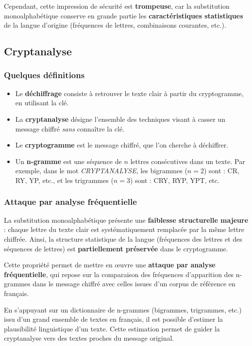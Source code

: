 \documentclass[a4paper]{article}
\begin{document}
Cependant, cette impression de sécurité est \textbf{trompeuse}, car la substitution monoalphabétique conserve en grande partie les \textbf{caractéristiques statistiques} de la langue d’origine (fréquences de lettres, combinaisons courantes, etc.).

\subsection{Cryptanalyse}

\subsubsection{Quelques définitions}

\begin{itemize}
    \item Le \textbf{déchiffrage} consiste à retrouver le texte clair à partir du cryptogramme, en utilisant la clé.
    \item La \textbf{cryptanalyse} désigne l’ensemble des techniques visant à casser un message chiffré \textit{sans} connaître la clé.
    \item Le \textbf{cryptogramme} est le message chiffré, que l’on cherche à déchiffrer.
    \item Un \textbf{n-gramme} est une séquence de $n$ lettres consécutives dans un texte. Par exemple, dans le mot \textit{CRYPTANALYSE}, les bigrammes ($n = 2$) sont : CR, RY, YP, etc., et les trigrammes ($n = 3$) sont : CRY, RYP, YPT, etc.
\end{itemize}

\subsubsection{Attaque par analyse fréquentielle}

La substitution monoalphabétique présente une \textbf{faiblesse structurelle majeure} : chaque lettre du texte clair est systématiquement remplacée par la même lettre chiffrée. Ainsi, la structure statistique de la langue (fréquences des lettres et des séquences de lettres) est \textbf{partiellement préservée} dans le cryptogramme.

Cette propriété permet de mettre en œuvre une \textbf{attaque par analyse fréquentielle}, qui repose sur la comparaison des fréquences d’apparition des n-grammes dans le message chiffré avec celles issues d’un corpus de référence en français.

En s’appuyant sur un dictionnaire de n-grammes (bigrammes, trigrammes, etc.) issu d’un grand ensemble de textes en français, il est possible d’estimer la plausibilité linguistique d’un texte. Cette estimation permet de guider la cryptanalyse vers des textes proches du message original.
\end{document}
